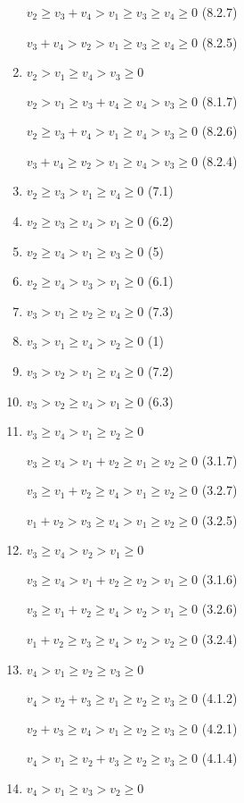 \documentclass{article}
\begin{document}
\begin{enumerate}
    $v_2\geq{v_3+v_4}>v_1\geq{v_3}\geq{v_4}\geq{0}$ (8.2.7)

    $v_3+v_4>{v_2}>v_1\geq{v_3}\geq{v_4}\geq{0}$ (8.2.5)

    \item $v_2>v_1\geq{v_4}>v_3\geq{0}$

    $v_2>v_1\geq{v_3+v_4}\geq{v_4}>v_3\geq{0}$ (8.1.7)

    $v_2\geq{v_3+v_4}>v_1\geq{v_4}>v_3\geq{0}$ (8.2.6)

    $v_3+v_4\geq{v_2}>v_1\geq{v_4}>v_3\geq{0}$ (8.2.4)

    \item $v_2\geq{v_3}>v_1\geq{v_4}\geq{0}$ (7.1)
    \item $v_2\geq{v_3}\geq{v_4}>v_1\geq{0}$ (6.2)
    \item $v_2\geq{v_4}>v_1\geq{v_3}\geq{0}$ (5)
    \item $v_2\geq{v_4}>v_3>v_1\geq{0}$ (6.1)
    \item $v_3>v_1\geq{v_2}\geq{v_4}\geq{0}$ (7.3)
    \item $v_3>v_1\geq{v_4}>v_2\geq{0}$ (1)
    \item $v_3>v_2>v_1\geq{v_4}\geq{0}$ (7.2)
    \item $v_3>v_2\geq{v_4}>v_1\geq{0}$ (6.3)
    \item $v_3\geq{v_4}>v_1\geq{v_2}\geq{0}$

    $v_3\geq{v_4}>v_1+v_2\geq{v_1}\geq{v_2}\geq{0}$ (3.1.7)

    $v_3\geq{v_1+v_2}\geq{v_4}>v_1\geq{v_2}\geq{0}$ (3.2.7)

    $v_1+v_2>v_3\geq{v_4}>v_1\geq{v_2}\geq{0}$ (3.2.5)

    \item $v_3\geq{v_4}>v_2>v_1\geq{0}$

    $v_3\geq{v_4}>v_1+v_2\geq{v_2}>v_1\geq{0}$ (3.1.6)

    $v_3\geq{v_1+v_2}\geq{v_4>}v_2>v_1\geq{0}$ (3.2.6)

    $v_1+v_2\geq{v_3}\geq{v_4}>v_2>v_2\geq{0}$ (3.2.4)

    \item $v_4>v_1\geq{v_2}\geq{v_3}\geq{0}$

    $v_4>v_2+v_3\geq{v_1}\geq{v_2}\geq{v_3}\geq{0}$ (4.1.2)

    $v_2+v_3\geq{v_4}>v_1\geq{v_2}\geq{v_3}\geq{0}$ (4.2.1)
    
    $v_4>v_1\geq{v_2+v_3}\geq{v_2}\geq{v_3}\geq{0}$ (4.1.4)

    \item $v_4>v_1\geq{v_3}>v_2\geq{0}$


\end{enumerate}
\end{document}

